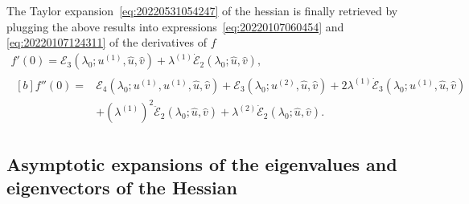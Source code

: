 \documentclass[12pt, final]{scrartcl}
\theoremstyle{definition}
\newcommand{\E}{\mathcal E}
\newcommand{\order}[2][1]{#2^{(#1)}}
\begin{document}
The Taylor expansion~\eqref{eq:20220531054247} of the hessian is finally retrieved by plugging the above results into
expressions~\eqref{eq:20220107060454} and \eqref{eq:20220107124311} of the derivatives of $f$
\begin{gather*}
  f'(0) = \E_3(\lambda_0; \order[1]u, \hat{u}, \hat{v}) + \order[1]\lambda \dot{\E}_2(\lambda_0; \hat{u}, \hat{v}),\\
  \begin{aligned}[b]
    f''(0) = {} & \E_4(\lambda_0; \order[1]u, \order[1]u, \hat{u}, \hat{v}) + \E_3(\lambda_0; \order[2]u, \hat{u}, \hat{v}) + 2\order[1]\lambda \dot{\E}_3(\lambda_0; \order[1]u, \hat{u}, \hat{v})\\
                & + ( \order[1]\lambda )^2 \ddot{\E}_2(\lambda_0; \hat{u}, \hat{v}) + \order[2]\lambda \dot{\E}_2(\lambda_0; \hat{u}, \hat{v}).
  \end{aligned}
\end{gather*}

\subsection{Asymptotic expansions of the eigenvalues and eigenvectors of the Hessian}
\label{sec:20220616074108}
\end{document}
